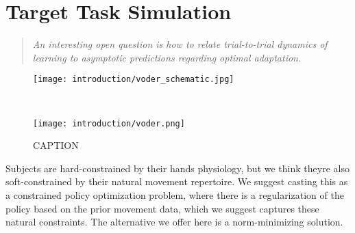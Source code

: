 \documentclass[../main.tex]{subfiles}
\begin{document}
\chapter{Target Task Simulation}\label{chap:reinforce}

\begin{quote}
  \emph{An interesting open question is how to relate trial-to-trial dynamics of learning to asymptotic predictions regarding optimal adaptation.}\\
\end{quote}
\cleardoublepage%

\begin{figure}
    \centering
    \begin{minipage}{0.8\textwidth}
      \texttt{[image: introduction/voder\_schematic.jpg]}
      \subcaption{}
    \end{minipage}\\%
    \begin{minipage}{0.5\textwidth}
      \texttt{[image: introduction/voder.png]}
      \subcaption{}
    \end{minipage}
    \caption{CAPTION}\label{fig:voder}
  \end{figure}


Subjects are hard-constrained by their hands physiology, but we think theyre also soft-constrained by their natural movement repertoire. We suggest casting this as a constrained policy optimization problem, where there is a regularization of the policy based on the prior movement data, which we suggest captures these natural constraints. The alternative we offer here is a norm-minimizing solution.


\cleardoublepage\printendnotes%
\ifSubfilesClassLoaded{%
    \newpage%
}{}%
\end{document}
